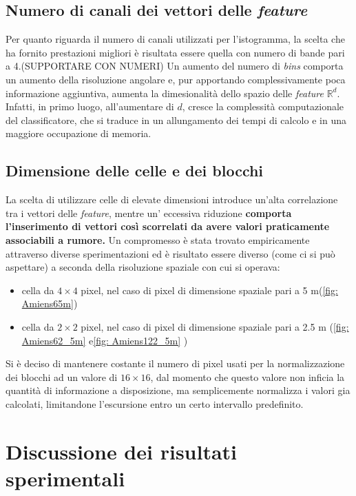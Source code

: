 \subsection{Numero di canali dei vettori delle \emph{feature}}
Per quanto riguarda il numero di canali utilizzati per l'istogramma, la scelta che ha fornito prestazioni migliori è risultata essere quella con numero di bande pari a 4.(SUPPORTARE CON NUMERI) Un aumento del numero di \emph{bins} comporta un aumento della risoluzione angolare e, pur apportando complessivamente poca informazione aggiuntiva,  aumenta la dimesionalità dello spazio delle \emph{feature} $\mathbb{R}^d$. Infatti, in primo luogo, all'aumentare di $d$, cresce la complessità computazionale del classificatore, che si traduce in un allungamento dei tempi di calcolo e in una maggiore occupazione di memoria.

\subsection{Dimensione delle celle e dei blocchi}
La scelta di utilizzare celle di elevate dimensioni introduce un'alta correlazione tra i vettori delle \emph{feature}, mentre un' eccessiva riduzione \textbf{comporta l'inserimento di vettori così scorrelati da avere valori praticamente associabili a rumore.} Un compromesso  è stata trovato empiricamente attraverso diverse sperimentazioni ed è risultato essere diverso (come ci si può aspettare) a seconda della risoluzione spaziale con cui si operava:
\begin{itemize}
\item cella da $4\times 4$ pixel, nel caso di pixel di dimensione spaziale pari a 5 m(\ref{fig: Amiens65m})
\item cella da $2 \times 2$ pixel, nel caso di pixel di dimensione spaziale pari a 2.5 m (\ref{fig: Amiens62_5m} e\ref{fig: Amiens122_5m} )
\end{itemize}

Si è deciso di mantenere costante il numero di pixel usati per la normalizzazione dei blocchi ad un valore di $16\times16$, dal momento che questo valore non inficia la quantità di informazione a disposizione, ma semplicemente normalizza i valori gia calcolati, limitandone l'escursione entro un certo intervallo predefinito.

\clearpage

\section{Discussione dei risultati sperimentali}

